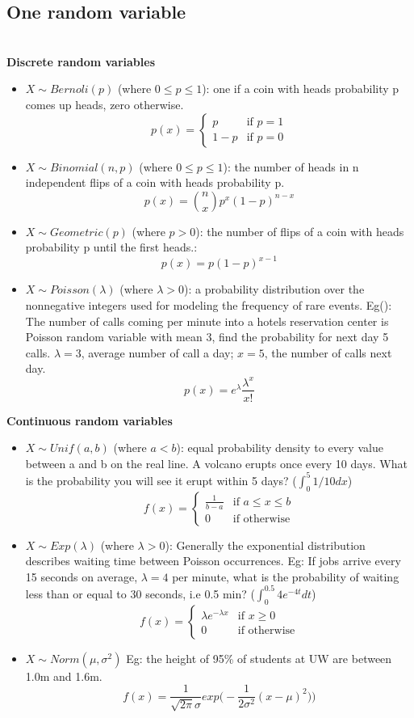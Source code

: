 \documentclass[a4paper,12pt]{article}
\let\cite\parencite
\begin{document}
\subsection{One random variable} \cite{pro} \\
\textbf{Discrete random variables}\\
\begin{itemize}
\item $X \sim Bernoli(p)$ (where $0 \leq p \leq 1$): one if a coin with heads probability p comes up heads, zero otherwise.
\[
 p(x) = 
  \begin{cases} 
   p & \text{if } p = 1 \\
   1 - p      & \text{if } p = 0
  \end{cases}
\]
\item $X \sim Binomial(n,p)$ (where $0 \leq p \leq 1$): the number of heads in n independent flips of a coin with heads probability p.
$$p(x) = \binom{n}{x} p^x(1 - p)^{n - x}$$
\item $X \sim Geometric(p)$ (where $p > 0$): the number of flips of a coin with heads probability p until the first heads.:
$$p(x) = p(1 - p)^{x - 1}$$
\item $X \sim Poisson(\lambda)$ (where $\lambda > 0$): a probability distribution over the nonnegative integers used for modeling the frequency of rare events. Eg(\cite{pois}): The number of calls coming per minute into a hotels reservation center is Poisson random variable with mean 3, find the probability for next day 5 calls. $\lambda = 3$, average number of call a day; $x = 5$, the number of calls next day.
$$p(x) = e^{\lambda} \frac{\lambda^x}{x!}$$
\end{itemize}
\textbf{Continuous random variables} \\
\begin{itemize}
\item $X \sim Unif(a,b)$ (where $a < b$): equal probability density to every value between a and b on the real line. A volcano erupts once every 10 days. What is the probability you will see it erupt within 5 days? ($\int_{0}^{5} 1/10dx$)
\[
 f(x) = 
  \begin{cases} 
   \frac{1}{b - a} & \text{if } a \leq x \leq b \\
   0      & \text{if otherwise}
  \end{cases}
\]
\item $X \sim Exp(\lambda)$ (where $\lambda > 0$): Generally the exponential distribution describes waiting time between Poisson occurrences. Eg: If jobs arrive every 15 seconds on average, $\lambda = 4$ per minute, what is the probability of waiting less than or equal to 30 seconds, i.e 0.5 min? ($\int_{0}^{0.5} 4e^{-4t}dt$)
\[
 f(x) = 
  \begin{cases} 
   \lambda e^{-\lambda x} & \text{if } x \geq 0 \\
   0      & \text{if otherwise}
  \end{cases}
\]

\item $X \sim Norm(\mu, \sigma^2)$
Eg:  the height of 95\% of students at UW are between 1.0m and 1.6m.
$$f(x) = \frac{1}{\sqrt{2\pi}\sigma}exp\Big (-\frac{1}{2\sigma^2}(x - \mu)^2) \Big )$$
\end{itemize}
\end{document}
